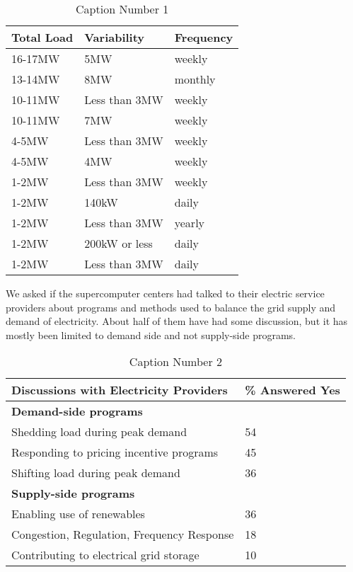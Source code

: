 \begin{table}[htbp]

\begin{center}
\caption{Caption Number 1}
\begin{tabular}{|p{65pt}|l|l|}
\hline
\textbf{Total Load}&
\textbf{Variability}&
\textbf{Frequency} \\
\hline
16-17MW&
5MW&
weekly \\
\hline
13-14MW&
8MW&
monthly \\
\hline
10-11MW&
Less than 3MW&
weekly \\
\hline
10-11MW&
7MW&
weekly \\
\hline
4-5MW&
Less than 3MW&
weekly \\
\hline
4-5MW&
4MW&
weekly \\
\hline
1-2MW&
Less than 3MW&
weekly \\
\hline
1-2MW&
140kW&
daily \\
\hline
1-2MW&
Less than 3MW&
yearly \\
\hline
1-2MW&
200kW or less&
daily \\
\hline
1-2MW&
Less than 3MW&
daily \\
\hline
\end{tabular}
\label{tab1}
\end{center}
\end{table}

We asked if the supercomputer centers had talked to their electric service
providers about programs and methods used to balance the grid supply and
demand of electricity. About half of them have had some discussion, but it
has mostly been limited to demand side and not supply-side programs.


\begin{table}[htbp]

\begin{center}
\caption{Caption Number 2}
\begin{tabular}{|p{230pt}|l|}
\hline
\textbf{Discussions with Electricity Providers}&
{\%} Answered Yes \\
\hline
\textbf{Demand-side programs}&
~ \\
\hline
Shedding load during peak demand&
54 \\
\hline
Responding to pricing incentive programs&
45 \\
\hline
Shifting load during peak demand&
36 \\
\hline
\textbf{Supply-side programs}&
~ \\
\hline
Enabling use of renewables&
36 \\
\hline
Congestion, Regulation, Frequency Response&
18 \\
\hline
Contributing to electrical grid storage&
10 \\
\hline
\end{tabular}
\label{tab2}
\end{center}
\end{table}

